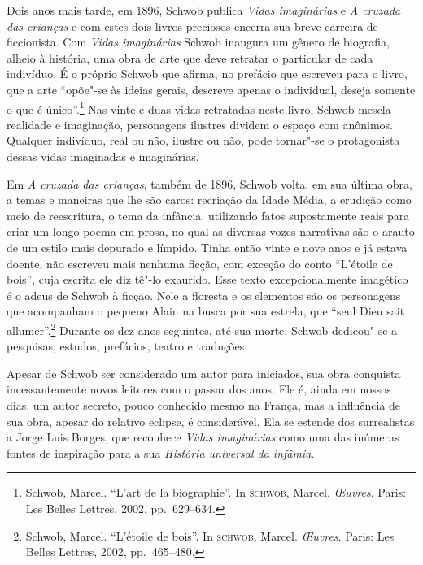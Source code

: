 Dois anos mais tarde, em 1896, Schwob publica \textit{Vidas imaginárias} e
\textit{A cruzada das crianças} e com estes dois livros preciosos
encerra sua breve carreira de ficcionista. Com \textit{Vidas imaginárias} Schwob
inaugura um gênero de biografia, alheio à história, uma obra de
arte que deve retratar o particular de cada indivíduo. É o próprio Schwob que
afirma, no prefácio que escreveu para o livro, que a arte “opõe"-se às ideias
gerais, descreve apenas o individual, deseja somente o que é único”.\footnote{ Schwob, Marcel. 
``L’art de la biographie''. In \textsc{schwob}, Marcel. \textit{\OE uvres}.
Paris: Les Belles Lettres, 2002, pp.~629--634.} Nas vinte e duas vidas
retratadas neste livro, Schwob mescla realidade e imaginação, personagens
ilustres dividem o espaço com anônimos. Qualquer indivíduo, real ou não,
ilustre ou não, pode tornar"-se o protagonista dessas vidas imaginadas e imaginárias.

Em \textit{A cruzada das crianças}, também de 1896,
Schwob volta, em sua última obra, a temas e maneiras que lhe são caros:
recriação da Idade Média, a erudição como meio de reescritura, o tema da
infância, utilizando fatos supostamente reais para criar um longo poema em
prosa, no qual as diversas vozes narrativas são o arauto de um estilo mais
depurado e límpido. Tinha então vinte e nove anos e já estava doente, não
escreveu mais nenhuma ficção, com exceção do conto “L'étoile de bois”, cuja
escrita ele diz tê"-lo exaurido. Esse texto excepcionalmente imagético é o adeus de Schwob
à ficção. Nele a floresta e
os elementos são os personagens que acompanham o pequeno Alain na busca por sua
estrela, que “seul Dieu sait allumer”.\footnote{ Schwob, Marcel. ``L’étoile de
bois''. In \textsc{schwob}, Marcel. \textit{\OE uvres}. Paris: Les Belles Lettres, 2002, pp.~465--480.}
Durante os dez anos seguintes, até sua morte, Schwob dedicou"-se a
pesquisas, estudos, prefácios, teatro e traduções.

Apesar de Schwob ser considerado um autor para iniciados, sua obra conquista
incessantemente novos leitores com o passar dos anos. Ele é, ainda em nossos
dias, um autor secreto, pouco conhecido mesmo na França, mas a influência de
sua obra, apesar do relativo eclipse, é considerável. Ela se estende
dos surrealistas a Jorge Luis Borges, que reconhece \textit{Vidas imaginárias}
como uma das inúmeras fontes de inspiração para a sua \textit{História
universal da infâmia}.

